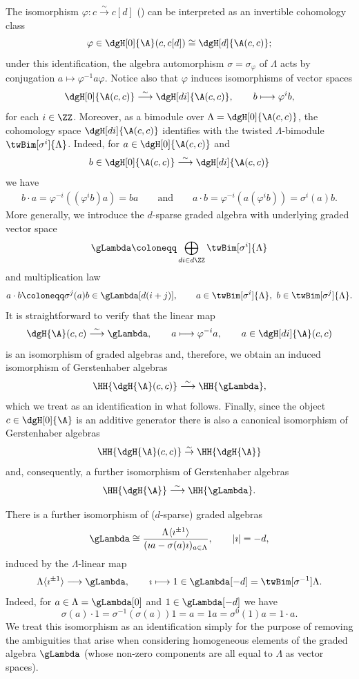 \documentclass[a4paper]{amsart}
\begin{document}
The isomorphism $\varphi\colon c\stackrel{\sim}{\to}c[d]$ ()
can be interpreted as an invertible cohomology class
\[
  \varphi\in\dgH[0]{\A}(c,c[d])\cong\dgH[d]{\A(c,c)};
\]
under this identification, the algebra automorphism $\sigma=\sigma_\varphi$ of
$\Lambda$ acts by conjugation $a\mapsto \varphi^{-1}a\varphi$. Notice also that
$\varphi$ induces isomorphisms of vector spaces
\[
  \dgH[0]{\A(c,c)}\stackrel{\sim}{\longrightarrow}\dgH[di]{\A(c,c)},\qquad
  b\longmapsto\varphi^{i}b,
\]
for each $i\in\ZZ$. Moreover, as a bimodule over $\Lambda=\dgH[0]{\A(c,c)}$, the
cohomology space $\dgH[di]{\A(c,c)}$ identifies with the twisted
$\Lambda$-bimodule $\twBim[\sigma^i]{\Lambda}$. Indeed, for
$a\in\dgH[0]{\A(c,c)}$ and
\[
  b\in\dgH[0]{\A(c,c)}\stackrel{\sim}{\longrightarrow}\dgH[di]{\A(c,c)}
\]
we have
\begin{align*}
  b\cdot a=\varphi^{-i}((\varphi^i b) a)=b a\qquad\text{and}\qquad
  a\cdot b=\varphi^{-i}(a  (\varphi^{i} b))=\sigma^i(a) b.
\end{align*}
More generally, we introduce the $d$-sparse graded algebra with underlying
graded vector space
\[
  \gLambda\coloneqq\bigoplus_{di\in d\ZZ}\twBim[\sigma^i]{\Lambda}
\]
and multiplication law
\[
  a\cdot b\coloneqq\sigma^j(a)b\in\gLambda[d(i+j)],\qquad
  a\in\twBim[\sigma^i]{\Lambda},\ b\in\twBim[\sigma^j]{\Lambda}.
\]
It is straightforward to verify that the linear map
\[
  \dgH{\A}(c,c)\stackrel{\sim}{\longrightarrow}\gLambda,\qquad
  a\longmapsto\varphi^{-i}a,\qquad a\in\dgH[di]{\A}(c,c)
\]
is an isomorphism of graded algebras and, therefore, we obtain an induced
isomorphism of Gerstenhaber algebras
\[
  \HH{\dgH{\A}(c,c)}\stackrel{\sim}{\longrightarrow}\HH{\gLambda},
\]
which we treat as an identification in what follows. Finally, since the object
$c\in\dgH[0]{\A}$ is an additive generator there is also a canonical isomorphism
of Gerstenhaber algebras
\[
  \HH{\dgH{\A}(c,c)}\stackrel{\sim}{\to}\HH{\dgH{\A}}
\]
and, consequently, a further isomorphism of Gerstenhaber algebras
\[
  \HH{\dgH{\A}}\stackrel{\sim}{\longrightarrow}\HH{\gLambda}.
\]

\begin{remark}
  \label{rmk:Lambda-sigma-d}
  There is a further isomorphism of ($d$-sparse) graded algebras
  \[
    \gLambda\cong\frac{\Lambda\langle\imath^{\pm 1}\rangle}{(\imath
      a-\sigma(a)\imath)_{a\in\Lambda}},\qquad |\imath|=-d,
  \]
  induced by the $\Lambda$-linear map
  \[
    \Lambda\langle\imath^{\pm
      1}\rangle\longrightarrow\gLambda,\qquad\imath\longmapsto1\in\gLambda[-d]=\twBim[\sigma^{-1}]{\Lambda}.
  \]
  Indeed, for $a\in\Lambda=\gLambda[0]$ and $1\in\gLambda[-d]$ we
  have
  \[
    \sigma(a)\cdot1=\sigma^{-1}(\sigma(a))1=a=1a=\sigma^0(1)a=1\cdot a.
  \]
  We treat this isomorphism as an identification simply for the purpose of
  removing the ambiguities that arise when considering homogeneous elements of
  the graded algebra $\gLambda$ (whose non-zero components are all equal to
  $\Lambda$ as vector spaces).
\end{remark}
\end{document}

